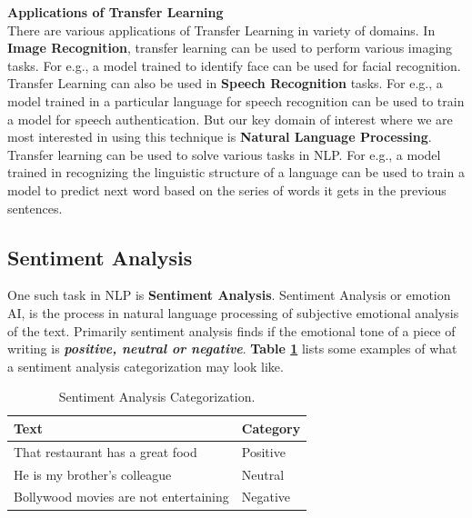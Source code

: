 \documentclass[a4paper, 12pt]{article}
\begin{document}
\begin{sloppypar}
\large \textbf{Applications of Transfer Learning} \\ [0.5ex]
\normalsize
There are various applications of Transfer Learning in variety of domains. In \textbf{Image Recognition}, transfer learning can be used to perform various imaging tasks. For e.g.,  a model trained to identify face can be used for facial recognition. Transfer Learning can also be used in \textbf{Speech Recognition} tasks.  For e.g., a model trained in a particular language for speech recognition can be used to train a model for speech authentication. But our key domain of interest where we are most interested in using this technique is \textbf{Natural Language Processing}. Transfer learning can be used to solve various tasks in  NLP. For e.g., a model trained in recognizing the linguistic structure of a language can be used to train a model to predict next word based on the series of words it gets in the previous sentences.

\subsection{Sentiment Analysis}
One such task in NLP is \textbf{Sentiment Analysis}. Sentiment Analysis or emotion AI, is the process in natural language processing  of subjective emotional analysis of the text. Primarily sentiment analysis finds if the emotional tone of a piece of writing is \textbf{\textit{positive, neutral or negative}}. \textbf{Table \ref{table: category}} lists some examples of what a sentiment analysis categorization may look like.
\begin{table}[H]
\caption{ Sentiment Analysis Categorization.\label{table: category}}

\begin{tabularx}{\columnwidth}{| X | X |}
\hline
Text & Category \\ [0.5ex]
\hline
\hline
That restaurant has a great food & Positive \\ [0.5ex]
\hline
He is my brother's colleague & Neutral \\ [0.5ex]
\hline
Bollywood movies are not entertaining & Negative \\ [0.5ex]
\hline
\end{tabularx}
\end{table}


\end{sloppypar}
\end{document}
